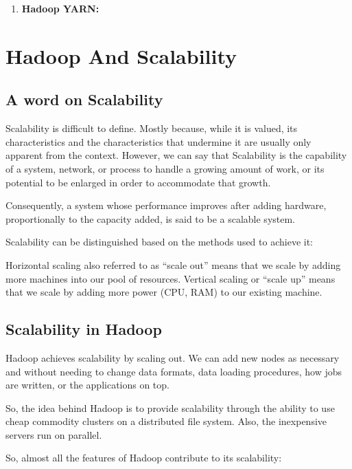 \documentclass[conference]{IEEEtran}
\begin{document}
\begin{enumerate}
        \item \textbf{Hadoop YARN:}
\end{enumerate}


\section{Hadoop And Scalability}

\subsection{A word on Scalability}

Scalability is difficult to define. \cite{Hill1990} Mostly because, while it is valued, its characteristics and
the characteristics that undermine it are usually only apparent from the context. However,
we can say that Scalability is the capability of a system, network, or process to handle a
growing amount of work, or its potential to be enlarged in order to accommodate that
growth. \cite{Bondi2000}

Consequently, a system whose performance improves after adding hardware,
proportionally to the capacity added, is said to be a scalable system.

Scalability can be distinguished based on the methods used to achieve it:

Horizontal scaling also referred to as “scale out” means that we scale by adding more
machines into our pool of resources.
Vertical scaling or “scale up” means that we scale by adding more power (CPU, RAM) to
our existing machine.

\subsection{Scalability in Hadoop}

Hadoop achieves scalability by scaling out. We can add new nodes as necessary and without needing to change data formats, data loading procedures, how jobs are written, or the applications on top.

So, the idea behind Hadoop is to provide scalability through the ability to use cheap commodity clusters on a distributed file system. 
Also, the inexpensive servers run on parallel. 

So, almost all the features of Hadoop contribute to its scalability:
\end{document}
